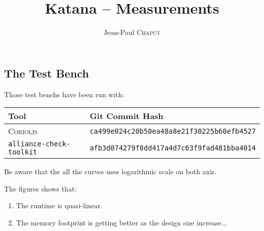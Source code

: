 \documentclass[11pt]{article}
\newcommand {\Chaput} {\textsc{Chaput}\xspace}
\begin{document}
   

   \title{Katana -- Measurements}
   \author{Jean-Paul \Chaput}

   \maketitle

   \thispagestyle{fancy}

   \subsection*{The Test Bench}

   Those test benchs have been run with:

   \begin{tabular}{|l|l|}
      \hline
      \textbf{Tool}                   & \textbf{Git Commit Hash} \\
      \hline
      \textsc{Coriolis}               & \texttt{ca499e024c20b50ea48a8e21f30225b60efb4527} \\
      \texttt{alliance-check-toolkit} & \texttt{afb3d074279f8dd417a4d7c63f9fad481bba4014} \\
      \hline
   \end{tabular}


   Be aware that the all the curves uses logarithmic scale on both axis.

   The figures shows that:
   \begin{enumerate}
     \item The runtime is quasi-linear.
     \item The memory footprint is getting better as the design size
           increase...
   \end{enumerate}


   \begin{center}
   \end{center}
   \begin{center}
   \end{center}


%  
%      
\end{document}
